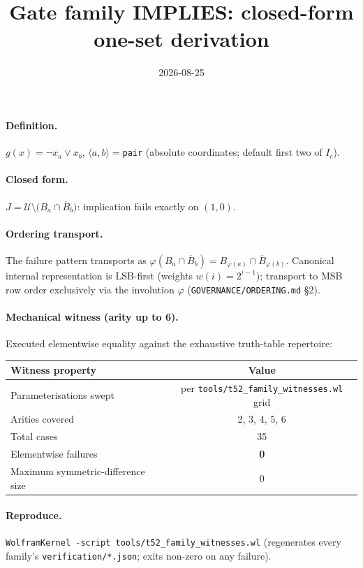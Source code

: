 \documentclass{article}
\title{Gate family IMPLIES: closed-form one-set derivation}
\date{2026-08-25}
\begin{document}
\maketitle

\paragraph{Definition.} $g(x)=\neg x_{a}\vee x_{b}$, $\langle a,b\rangle=$\texttt{pair} (absolute coordinates; default first two of $I_c$).

\paragraph{Closed form.} $J=\mathcal{U}\setminus\bigl(B_{a}\cap\overline{B}_{b}\bigr)$: implication fails exactly on $(1,0)$.

\paragraph{Ordering transport.} The failure pattern transports as $\varphi(B_a\cap\overline{B}_b)=B_{\varphi(a)}\cap\overline{B}_{\varphi(b)}$.
Canonical internal representation is LSB-first (weights $w(i)=2^{i-1}$);
transport to MSB row order exclusively via the involution $\varphi$
(\texttt{GOVERNANCE/ORDERING.md} \S2).

\paragraph{Mechanical witness (arity up to 6).} Executed elementwise equality
against the exhaustive truth-table repertoire:
\begin{center}
\begin{tabular}{lc}
\hline
Witness property & Value \\ \hline
Parameterisations swept & per \texttt{tools/t52_family_witnesses.wl} grid \\
Arities covered & 2, 3, 4, 5, 6 \\
Total cases & 35 \\
Elementwise failures & \textbf{0} \\
Maximum symmetric-difference size & 0 \\ \hline
\end{tabular}
\end{center}

\paragraph{Reproduce.} \texttt{WolframKernel -script tools/t52_family_witnesses.wl}
(regenerates every family's \texttt{verification/*.json}; exits non-zero on any failure).
\end{document}
